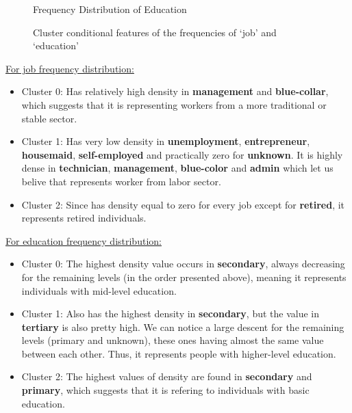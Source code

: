 \documentclass[12pt]{article}
\begin{document}
\begin{enumerate}
\begin{enumerate}[label=\alph*)]
\begin{figure}[h]
\begin{minipage}{0.43\textwidth}
                \caption{Frequency Distribution of Education}
            \end{minipage}
            \caption{Cluster conditional features of the frequencies of `job' and `education'}
        \end{figure}

        \newpage
        \underline{For job frequency distribution:}

        \begin{itemize}
            \item Cluster 0: Has relatively high density in \textbf{management} and \textbf{blue-collar}, which suggests that it is representing workers from a more traditional or stable sector.
            
            \item Cluster 1: Has very low density in \textbf{unemployment}, \textbf{entrepreneur}, \textbf{housemaid}, \textbf{self-employed} and practically zero for \textbf{unknown}. It is highly dense in \textbf{technician}, \textbf{management}, \textbf{blue-color} and \textbf{admin} which let us belive that represents worker from labor sector.
            
            \item Cluster 2: Since has density equal to zero for every job except for \textbf{retired}, it represents retired individuals.
        \end{itemize}

        \vspace{10pt}
        \underline{For education frequency distribution:}
        
        \begin{itemize}
            \item Cluster 0: The highest density value occurs in \textbf{secondary}, always decreasing for the remaining levels 
            (in the order presented above), meaning it represents individuals with mid-level education.
            
            \item Cluster 1: Also has the highest density in \textbf{secondary}, but the value in \textbf{tertiary} is also pretty high. 
            We can notice a large descent for the remaining levels (primary and unknown), these ones having almost the same value 
            between each other. Thus, it represents people with higher-level education.
            
            \item Cluster 2: The highest values of density are found in \textbf{secondary} and \textbf{primary}, which suggests that it is 
            refering to individuals with basic education.
        \end{itemize}
        

\end{enumerate}
\end{enumerate}
\end{document}

